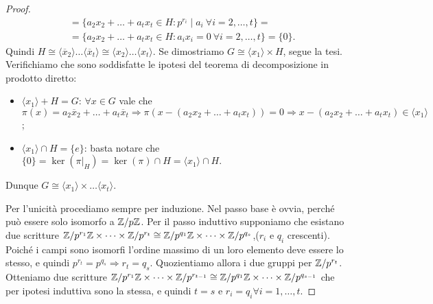 \begin{proof}
\begin{align}
    & = \{a_2 x_2+\dots+a_t x_t \in H : p^{r_i} \mid a_i \ \forall i = 2,\dots, t\}  = \nonumber \\
    & = \{a_2 x_2+\dots+a_t x_t \in H : a_i x_i =  0 \ \forall i = 2,\dots, t\} = \{0\}. \nonumber 
    \end{align}
    Quindi $H \cong \langle \overline x_2 \rangle \dots \langle \overline x_t \rangle \cong \langle x_2 \rangle \dots  \langle  x_t \rangle$. Se dimostriamo $G \cong \langle x_1 \rangle \times H$, segue la tesi. Verifichiamo che sono soddisfatte le ipotesi del teorema di decomposizione in prodotto diretto: 
    \begin{itemize}
    \item $\langle x_1 \rangle + H  = G$: $\forall x \in G$ vale che $\pi(x) = a_2\overline x_2 + \dots + a_t \overline x_t \Rightarrow \pi(x - (a_2 x_2 + \dots + a_t  x_t)) = 0 \Rightarrow x - (a_2 x_2 + \dots + a_t  x_t) \in \langle x_1 \rangle$;
    \item $\langle x_1 \rangle \cap H = \{e\}$: basta notare che $\{0\} = \ker(\pi|_H) = \ker(\pi) \cap H = \langle x_1 \rangle \cap H.$
    \end{itemize}
    Dunque $G \cong \langle x_1 \rangle \times \dots \langle x_t \rangle$.

    Per l'unicità procediamo sempre per induzione. Nel passo base è ovvia, perché può essere solo isomorfo a $\mathbb{Z}/p\mathbb{Z}$. Per il passo induttivo supponiamo che esistano due scritture $\mathbb{Z}/p^{r_1}\mathbb{Z} \times \dots \times \mathbb{Z}/p^{r_t} \cong \mathbb{Z}/p^{q_1}\mathbb{Z} \times \dots \times \mathbb{Z}/p^{q_s}$,($r_i$ e $q_i$ crescenti). Poiché i campi sono isomorfi l'ordine massimo di un loro elemento deve essere lo stesso, e quindi  $p^{r_t} = p^{q_s} \Rightarrow r_t = q_s$. Quozientiamo allora i due gruppi per $\mathbb{Z}/p^{r_t}$. Otteniamo due scritture  $\mathbb{Z}/p^{r_1}\mathbb{Z} \times \dots \times \mathbb{Z}/p^{r_{t-1}} \cong \mathbb{Z}/p^{q_1}\mathbb{Z} \times \dots \times \mathbb{Z}/p^{q_{s-1}}$ che per ipotesi induttiva sono la stessa, e quindi $t = s$ e $r_i = q_i \forall i = 1,\dots,t$.
\end{proof}

